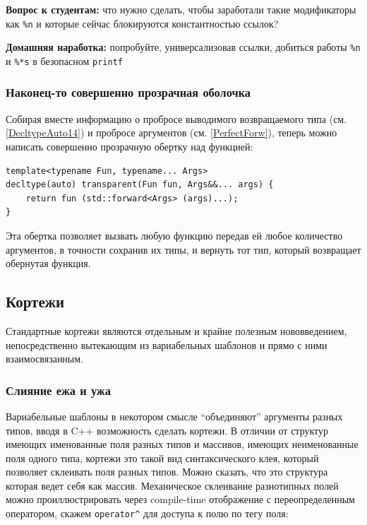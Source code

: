 \documentclass[a4paper,12pt,oneside]{article}
\newif\ifanswers
\begin{document}
\textbf{Вопрос к студентам:} что нужно сделать, чтобы заработали такие модификаторы как \lstinline!%n! и которые сейчас блокируются константностью ссылок?

\ifanswers
Правильный ответ: универсализовать ссылки

\begin{lstlisting}
template<typename T, typename... Args> int
pp_printf(const char* s, T&& value, Args&&... args)
\end{lstlisting}
\fi

\textbf{Домашняя наработка:} попробуйте, универсализовав ссылки, добиться работы \lstinline!%n! и \lstinline!%*s! в безопасном \lstinline!printf!

\subsubsection{Наконец-то совершенно прозрачная оболочка}\label{PerfectCloth}

Собирая вместе информацию о пробросе выводимого возвращаемого типа (см. \ref{DecltypeAuto14}) и пробросе аргументов (см. \ref{PerfectForw}), теперь можно написать совершенно прозрачную обертку над функцией:

\begin{lstlisting}
template<typename Fun, typename... Args>
decltype(auto) transparent(Fun fun, Args&&... args) { 
    return fun (std::forward<Args> (args)...); 
}
\end{lstlisting}

Эта обертка позволяет вызвать любую функцию передав ей любое количество аргументов, в точности сохранив их типы, и вернуть тот тип, который возвращает обернутая функция.

\pagebreak
\subsection{Кортежи}

Стандартные кортежи являются отдельным и крайне полезным нововведением, непосредственно вытекающим из вариабельных шаблонов и прямо с ними взаимосвязанным.

\subsubsection{Слияние ежа и ужа}

Вариабельные шаблоны в некотором смысле ``объединяют'' аргументы разных типов, вводя в C++ возможность сделать кортежи. В отличии от структур имеющих именованные поля разных типов и массивов, имеющих неименованные поля одного типа, кортежи это такой вид синтаксического клея, который позволяет склеивать поля разных типов. Можно сказать, что это структура которая ведет себя как массив. Механическое склеивание разнотипных полей можно проиллюстрировать через compile-time отображение с переопределенным оператором, скажем \lstinline!operator^! для доступа к полю по тегу поля:
\end{document}

